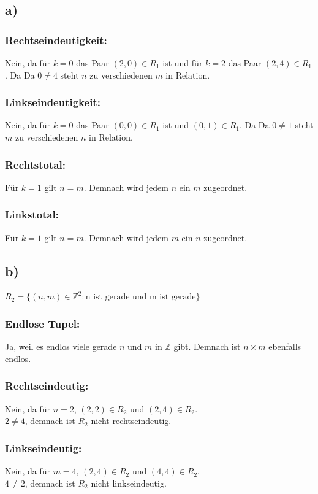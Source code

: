 \documentclass{article}
\begin{document}
\subsection*{a)}
\subsubsection*{Rechtseindeutigkeit:}
Nein, da für $k = 0$ das Paar $(2,0) \in R_{1}$ ist und für $k = 2$ das Paar $(2,4) \in R_{1}$. Da Da $0 \neq 4$ steht $n$ zu verschiedenen $m$ in Relation.

\subsubsection*{Linkseindeutigkeit:}
Nein, da für $k = 0$ das Paar $(0,0) \in R_{1}$ ist und $(0,1) \in R_{1}$. Da Da $0 \neq 1$ steht $m$ zu verschiedenen $n$ in Relation.

\subsubsection*{Rechtstotal:}
Für $k = 1$ gilt $n = m$. Demnach wird jedem $n$ ein $m$ zugeordnet.

\subsubsection*{Linkstotal:}
Für $k = 1$ gilt $n = m$. Demnach wird jedem $m$ ein $n$ zugeordnet.

\subsection*{b)}
$R_{2} = \{(n, m) \in \mathbb{Z}^2: \text{n ist gerade und m ist gerade}\}$

\subsubsection*{Endlose Tupel:}
Ja, weil es endlos viele gerade $n$ und $m$ in $\mathbb{Z}$ gibt. Demnach ist $n \times m$ ebenfalls endlos.

\subsubsection*{Rechtseindeutig: }
Nein, da für $n = 2$, $(2,2) \in R_{2}$ und $(2,4) \in R_{2}$. \\
$2 \neq 4$, demnach ist $R_{2}$ nicht rechtseindeutig.

\subsubsection*{Linkseindeutig: }
Nein, da für $m = 4$, $(2,4) \in R_{2}$ und $(4,4) \in R_{2}$. \\
$4 \neq 2$, demnach ist $R_{2}$ nicht linkseindeutig.
\end{document}

